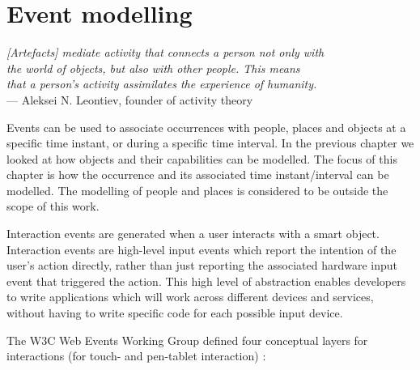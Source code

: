 \chapter{Event modelling}
\label{EventModelling}

\begin{flushright}{\slshape    
[Artefacts] mediate activity that connects a person not only with \\
 the world of objects, but also with other people. This means \\
that a person's activity assimilates the experience of humanity.} \\ \medskip
    ---  Aleksei N. Leontiev, founder of activity theory
\end{flushright}


Events can be used to associate occurrences with people, places and objects at a specific time instant, or during a specific time interval. In the previous chapter we looked at how objects and their capabilities can be modelled. The focus of this chapter is how the occurrence and its associated time instant/interval can be modelled. The modelling of people and places is considered to be outside the scope of this work.


Interaction events are generated when a user interacts with a smart object. Interaction events are high-level input events which report the intention of the user's action directly, rather than just reporting the associated hardware input event that triggered the action. This high level of abstraction enables developers to write applications which will work across different devices and services, without having to write specific code for each possible input device. 

The W3C Web Events Working Group defined four conceptual layers for interactions (for touch- and pen-tablet interaction) \cite{w3cevents}:

